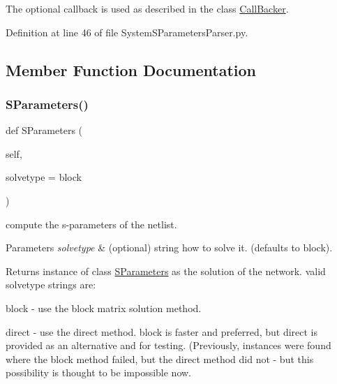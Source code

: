 The optional callback is used as described in the class \hyperlink{namespaceSignalIntegrity_1_1CallBacker}{Call\+Backer}. 

Definition at line 46 of file System\+S\+Parameters\+Parser.\+py.



\subsection{Member Function Documentation}
\mbox{\label{classSignalIntegrity_1_1Parsers_1_1SystemSParametersParser_1_1SystemSParametersNumericParser_a8d7c0357cfcdfd41f8cca9627ff9a61f}} 
\subsubsection{\texorpdfstring{S\+Parameters()}{SParameters()}}
{\footnotesize\ttfamily def S\+Parameters (\begin{DoxyParamCaption}\item[{}]{self,  }\item[{}]{solvetype = {\ttfamily \textquotesingle{}block\textquotesingle{}} }\end{DoxyParamCaption})}



compute the s-\/parameters of the netlist. 


\begin{DoxyParams}{Parameters}
{\em solvetype} & (optional) string how to solve it. (defaults to \textquotesingle{}block\textquotesingle{}). \\
\hline
\end{DoxyParams}
\begin{DoxyReturn}{Returns}
instance of class \hyperlink{namespaceSignalIntegrity_1_1SParameters}{S\+Parameters} as the solution of the network. valid solvetype strings are\+:
\begin{DoxyItemize}
\item \textquotesingle{}block\textquotesingle{} -\/ use the block matrix solution method.
\item \textquotesingle{}direct\textquotesingle{} -\/ use the direct method. \textquotesingle{}block\textquotesingle{} is faster and preferred, but direct is provided as an alternative and for testing. (Previously, instances were found where the block method failed, but the direct method did not -\/ but this possibility is thought to be impossible now. 
\end{DoxyItemize}
\end{DoxyReturn}


